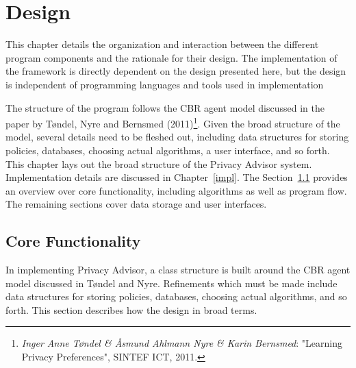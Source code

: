  

\chapter{Design}
\label{design}

\minitoc

This chapter details the organization and interaction between the different program components and the rationale for their design. The implementation of the framework is directly dependent on the design presented here, but the design is independent of programming languages and tools used in implementation

The structure of the program follows the CBR agent model discussed in the paper by T{\o}ndel, Nyre and Bernsmed (2011)\footnote{\emph{Inger Anne T{\o}ndel \& {\AA}smund Ahlmann Nyre \& Karin Bernsmed}: "Learning Privacy Preferences", SINTEF ICT, 2011.}. Given the broad structure of the model, several details need to be fleshed out, including data structures for storing policies, databases, choosing actual algorithms, a user interface, and so forth. This chapter lays out the broad structure of the Privacy Advisor system. Implementation details are discussed in Chapter~\ref{impl}. The Section~\ref{desOverview} provides an overview over core functionality, including algorithms as well as program flow. The remaining sections cover data storage and user interfaces.


\section{Core Functionality}\label{desOverview}
In implementing Privacy Advisor, a class structure is built around the CBR agent model discussed in T{\o}ndel and Nyre. Refinements which must be made include data structures for storing policies, databases, choosing actual algorithms, and so forth. This section describes how the design in broad terms. 


